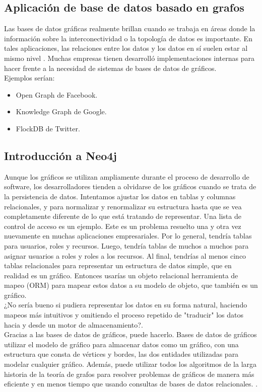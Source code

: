 \subsection{Aplicación de base de datos basado en grafos}
Las bases de datos gráficas realmente brillan cuando se trabaja en áreas donde la información sobre la interconectividad o la topología de datos es importante.
En tales aplicaciones, las relaciones entre los datos y los datos en sí suelen estar al mismo nivel . Muchas empresas tienen
desarrolló implementaciones internas para hacer frente a la necesidad de sistemas de bases de datos de gráficos\cite{miller2013graph}.\\
Ejemplos serían:
\begin{itemize}
    \item Open Graph de Facebook.
    \item Knowledge Graph de Google.
    \item FlockDB de Twitter.
\end{itemize}

\subsection{Introducción a Neo4j}
Aunque los gráficos se utilizan ampliamente durante el proceso de desarrollo de software, los desarrolladores tienden a olvidarse de los gráficos cuando se trata de la persistencia de datos. Intentamos ajustar los datos en tablas y columnas relacionales, y para normalizar y renormalizar
su estructura hasta que se vea completamente diferente de lo que está tratando de representar.
Una lista de control de acceso es un ejemplo. Este es un problema resuelto una y otra vez nuevamente en muchas aplicaciones empresariales. Por lo general, tendría tablas para usuarios, roles y recursos. Luego, tendría tablas de muchos a muchos para asignar usuarios a roles y roles a los recursos. Al final, tendrías al menos cinco tablas relacionales para representar un estructura de datos simple, que en realidad es un gráfico. Entonces usarías un objeto relacional herramienta de mapeo (ORM) para mapear estos datos a su modelo de objeto, que también es un gráfico.\\
¿No sería bueno si pudiera representar los datos en su forma natural, haciendo
mapeos más intuitivos y omitiendo el proceso repetido de "traducir" los datos
hacia y desde un motor de almacenamiento?.\\
Gracias a las bases de datos de gráficos, puede hacerlo. Bases de datos de gráficos utilizar el modelo de gráfico para almacenar datos como un gráfico, con una estructura que consta de vértices y bordes, las dos entidades utilizadas para modelar cualquier gráfico.
Además, puede utilizar todos los algoritmos de la larga historia de la teoría de grafos para resolver problemas de gráficos de manera más eficiente y en menos tiempo que usando consultas de bases de datos relacionales. \cite{vukotic2015neo4j}. 
